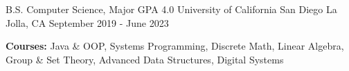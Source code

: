 
\begin{cventries}
  \cventry
    {B.S. Computer Science, Major GPA 4.0}
    {University of California San Diego}
    {La Jolla, CA}
    {September 2019 - June 2023}
    {
      \begin{cvitems}
        \item {\textbf{Courses:} Java \& OOP, Systems Programming, Discrete Math, Linear Algebra, Group \& Set Theory, Advanced Data Structures, Digital Systems}
      \end{cvitems}
    }
\end{cventries}
